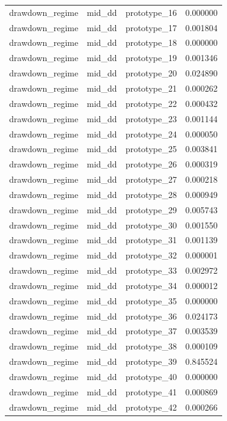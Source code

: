 \begin{tabular}{lllr}
drawdown\_regime & mid\_dd & prototype\_16 & 0.000000 \\
drawdown\_regime & mid\_dd & prototype\_17 & 0.001804 \\
drawdown\_regime & mid\_dd & prototype\_18 & 0.000000 \\
drawdown\_regime & mid\_dd & prototype\_19 & 0.001346 \\
drawdown\_regime & mid\_dd & prototype\_20 & 0.024890 \\
drawdown\_regime & mid\_dd & prototype\_21 & 0.000262 \\
drawdown\_regime & mid\_dd & prototype\_22 & 0.000432 \\
drawdown\_regime & mid\_dd & prototype\_23 & 0.001144 \\
drawdown\_regime & mid\_dd & prototype\_24 & 0.000050 \\
drawdown\_regime & mid\_dd & prototype\_25 & 0.003841 \\
drawdown\_regime & mid\_dd & prototype\_26 & 0.000319 \\
drawdown\_regime & mid\_dd & prototype\_27 & 0.000218 \\
drawdown\_regime & mid\_dd & prototype\_28 & 0.000949 \\
drawdown\_regime & mid\_dd & prototype\_29 & 0.005743 \\
drawdown\_regime & mid\_dd & prototype\_30 & 0.001550 \\
drawdown\_regime & mid\_dd & prototype\_31 & 0.001139 \\
drawdown\_regime & mid\_dd & prototype\_32 & 0.000001 \\
drawdown\_regime & mid\_dd & prototype\_33 & 0.002972 \\
drawdown\_regime & mid\_dd & prototype\_34 & 0.000012 \\
drawdown\_regime & mid\_dd & prototype\_35 & 0.000000 \\
drawdown\_regime & mid\_dd & prototype\_36 & 0.024173 \\
drawdown\_regime & mid\_dd & prototype\_37 & 0.003539 \\
drawdown\_regime & mid\_dd & prototype\_38 & 0.000109 \\
drawdown\_regime & mid\_dd & prototype\_39 & 0.845524 \\
drawdown\_regime & mid\_dd & prototype\_40 & 0.000000 \\
drawdown\_regime & mid\_dd & prototype\_41 & 0.000869 \\
drawdown\_regime & mid\_dd & prototype\_42 & 0.000266 \\

\end{tabular}
